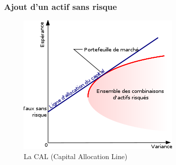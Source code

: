 \begin{frame}
    \frametitle{Ajout d'un actif sans risque} 
      \begin{figure}
	  \center
	  \includegraphics[scale=0.5]{images/cal.png}   
	  \caption{La CAL (Capital Allocation Line)}
      \end{figure} 
\end{frame}

